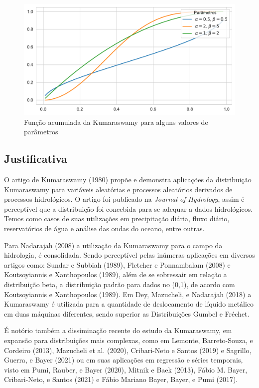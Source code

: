 \documentclass[
]{article}
\begin{document}
\begin{figure}[H]

{\centering \includegraphics{report_files/figure-pdf/fig-cumulative-output-1.pdf}

}

\caption{\label{fig-cumulative}Função acumulada da Kumaraswamy para
alguns valores de parâmetros}

\end{figure}

\subsection{Justificativa}

O artigo de Kumaraswamy (1980) propõe e demonstra aplicações da
distribuição Kumaraswamy para variáveis aleatórias e processos
aleatórios derivados de processos hidrológicos. O artigo foi publicado
na \emph{Journal of Hydrology}, assim é perceptível que a distribuição
foi concebida para se adequar a dados hidrológicos. Temos como casos de
suas utilizações em precipitação diária, fluxo diário, reservatórios de
água e análise das ondas do oceano, entre outras.

Para Nadarajah (2008) a utilização da Kumaraswamy para o campo da
hidrologia, é consolidada. Sendo perceptível pelas inúmeras aplicações
em diversos artigos como: Sundar e Subbiah (1989), Fletcher e
Ponnambalam (2008) e Koutsoyiannis e Xanthopoulos (1989), além de se
sobressair em relação a distribuição beta, a distribuição padrão para
dados no (0,1), de acordo com Koutsoyiannis e Xanthopoulos (1989). Em
Dey, Mazucheli, e Nadarajah (2018) a Kumaraswamy é utilizada para a
quantidade de deslocamento de líquido metálico em duas máquinas
diferentes, sendo superior as Distribuições Gumbel e Fréchet.

É notório também a dissiminação recente do estudo da Kumaraswamy, em
expansão para distribuições mais complexas, como em Lemonte,
Barreto-Souza, e Cordeiro (2013), Mazucheli et al. (2020), Cribari-Neto
e Santos (2019) e Sagrillo, Guerra, e Bayer (2021) ou em suas aplicações
em regressão e séries temporais, visto em Pumi, Rauber, e Bayer (2020),
Mitnik e Baek (2013), Fábio M. Bayer, Cribari-Neto, e Santos (2021) e
Fábio Mariano Bayer, Bayer, e Pumi (2017).
\end{document}

